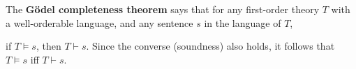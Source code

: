 The \textbf{Gödel completeness theorem} says that for any first-order theory $T$ with a well-orderable language, and any sentence $s$ in the language of $T$,

if $T\models s$, then $T \vdash s$.
Since the converse (soundness) also holds, it follows that $T \models s$ iff $T \vdash s$.
